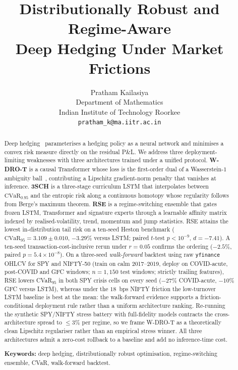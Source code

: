 \documentclass[10pt,letterpaper]{article}
\title{\bfseries Distributionally Robust and Regime-Aware\\
Deep Hedging Under Market Frictions}
\author{Pratham Kailasiya\\
Department of Mathematics\\
Indian Institute of Technology Roorkee\\
\texttt{pratham\_k@ma.iitr.ac.in}}
\date{}
\newcommand{\cvar}{\mathrm{CVaR}}
\begin{document}
\maketitle

\begin{abstract}
Deep hedging~\citep{buehler2019deep} parameterises a hedging
policy as a neural network and minimises a convex risk measure
directly on the residual P\&L. We address three deployment-limiting
weaknesses with three architectures trained under a unified
protocol. \textbf{W-DRO-T} is a causal Transformer whose loss is
the first-order dual of a Wasserstein-$1$ ambiguity
ball~\citep{blanchet2019quantifying}, contributing a Lipschitz
gradient-norm penalty that vanishes at inference. \textbf{3SCH} is
a three-stage curriculum LSTM that interpolates between
$\cvar_{0.95}$ and the entropic risk along a continuous homotopy
whose regularity follows from Berge's maximum theorem. \textbf{RSE}
is a regime-switching ensemble that gates frozen LSTM, Transformer
and signature experts through a learnable affinity matrix indexed
by realised-volatility, trend, momentum and jump statistics. RSE
attains the lowest in-distribution tail risk on a ten-seed Heston
benchmark ($\cvar_{95}=3.109\pm 0.010$, $-3.29\%$ versus LSTM;
paired $t$-test $p<10^{-9}$, $d=-7.41$). A ten-seed
transaction-cost-inclusive rerun under $r=0.05$ confirms the
ordering ($-2.5\%$, paired $p=5.4\times 10^{-8}$). On a three-seed
\emph{walk-forward} backtest using raw \texttt{yfinance} OHLCV for
SPY and NIFTY-50 (train on calm 2017--2019, deploy on COVID-acute,
post-COVID and GFC windows; $n=1{,}150$ test windows; strictly
trailing features), RSE lowers CVaR$_{95}$ in both SPY crisis cells
on every seed ($-27\%$ COVID-acute, $-10\%$ GFC versus LSTM),
whereas under the $18$~bps NIFTY friction the low-turnover LSTM
baseline is best at the mean: the walk-forward evidence supports a
friction-conditional deployment rule rather than a uniform
architecture ranking.
Re-running the synthetic SPY/NIFTY stress battery with
full-fidelity models contracts the cross-architecture spread to
$\le 3\%$ per regime, so we frame W-DRO-T as a theoretically clean
Lipschitz regulariser rather than an empirical stress winner. All
three architectures admit a zero-cost rollback to a baseline and
add no inference-time cost.

\medskip
\noindent\textbf{Keywords:} deep hedging, distributionally robust
optimisation, regime-switching ensemble, CVaR, walk-forward
backtest.
\end{abstract}
\end{document}
